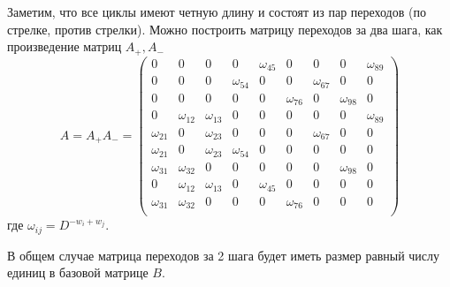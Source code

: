 Заметим, что все циклы имеют четную длину и состоят из пар переходов
(по стрелке, против стрелки). Можно построить матрицу переходов за
два шага, как произведение матриц $A_+, A_-$
\[
A=A_+A_{-}=\begin{pmatrix}
     0    & 0 &    0 &    0 &    \omega_{45}   &  0 &    0 &    0 &    \omega_{89}\\
     0&     0&     0&     \omega_{54} &    0  &   0  &   \omega_{67}  &   0  &   0 \\
     0&     0&     0&     0&     0&     \omega_{76} &     0&      \omega_{98}   &   0\\
     0&     \omega_{12}      & \omega_{13}  &    0 &    0  &   0 &    0  &   0      & \omega_{89} \\
\omega_{21}     &0     & \omega_{23}     &0   &0   &0     & \omega_{67}     &0 &   0\\
\omega_{21}     &0     & \omega_{23}      & \omega_{54}    &0   &0   &0   &0   & 0\\
\omega_{31}     & \omega_{32}  &0    &0   &0   &0   &0     & \omega_{98}     & 0\\
    0     & \omega_{12}      & \omega_{13}     &0    & \omega_{45}     &0   &0   &0   & 0\\
\omega_{31}      & \omega_{32}     &0   &0   &0     & \omega_{76}     &0   &0   & 0\\
\end{pmatrix}
\]
где
$\omega_{ij}=D^{-w_i+w_j}$.
%

В общем случае матрица переходов за 2 шага будет иметь размер равный числу единиц в 
базовой матрице $B$. 

